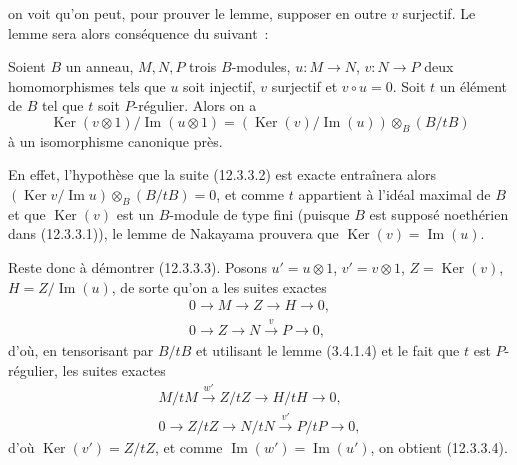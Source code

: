 on voit qu'on peut, pour prouver le lemme, supposer en
outre $v$ surjectif. Le lemme sera alors conséquence du suivant~:

\begin{lemma}[12.3.3.3]
\label{IV.12.3.3.3-fr}
Soient $B$ un anneau, $M,N,P$ trois $B$-modules,
$u:M\to N$, $v:N\to P$ deux homomorphismes tels que $u$ soit injectif, $v$
surjectif et $v\circ u=0$. Soit $t$ un élément de $B$ tel que $t$ soit
$P$-régulier. Alors on a
\begin{equation}
  \tag{12.3.3.4}
  \label{IV.12.3.3.4-fr}
  \operatorname{Ker}(v\otimes1)/\operatorname{Im}(u\otimes1)
  =(\operatorname{Ker}(v)/\operatorname{Im}(u))\otimes_B(B/tB)
\end{equation}
à un isomorphisme canonique près.
\end{lemma}

En effet, l'hypothèse que la suite (12.3.3.2) est exacte entraînera alors
$(\operatorname{Ker}v/\operatorname{Im}u)\otimes_B(B/tB)=0$, et comme $t$
appartient à l'idéal maximal de $B$ et que $\operatorname{Ker}(v)$ est un
$B$-module de type fini (puisque $B$ est supposé noethérien dans (12.3.3.1)),
le lemme de Nakayama prouvera que $\operatorname{Ker}(v)=\operatorname{Im}(u)$.

Reste donc à démontrer (12.3.3.3). Posons $u'=u\otimes1$, $v'=v\otimes1$,
$Z=\operatorname{Ker}(v)$, $H=Z/\operatorname{Im}(u)$, de sorte qu'on a les
suites exactes
\begin{gather*}
  0\to M\to Z\to H\to0,\\
  0\to Z\to N\xrightarrow{v}P\to0,
\end{gather*}
d'où, en tensorisant par $B/tB$ et utilisant le lemme (3.4.1.4) et le fait que
$t$ est $P$-régulier, les suites exactes
\begin{gather*}
  M/tM\xrightarrow{w'}Z/tZ\to H/tH\to0,\\
  0\to Z/tZ\to N/tN\xrightarrow{v'}P/tP\to0,
\end{gather*}
d'où $\operatorname{Ker}(v')=Z/tZ$, et comme
$\operatorname{Im}(w')=\operatorname{Im}(u')$, on obtient (12.3.3.4).

